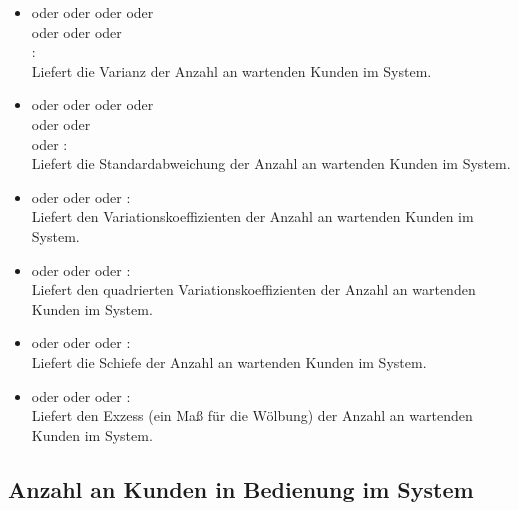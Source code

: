 \begin{itemize}
\item
{} oder  oder  oder  oder\\
 oder  oder  oder\\
:\\
Liefert die Varianz der Anzahl an wartenden Kunden im System.

\item
{} oder  oder  oder  oder\\
 oder  oder\\
 oder :\\
Liefert die Standardabweichung der Anzahl an wartenden Kunden im System.

\item
{} oder  oder  oder :\\
Liefert den Variationskoeffizienten der Anzahl an wartenden Kunden im System.

\item
{} oder  oder  oder :\\
Liefert den quadrierten Variationskoeffizienten der Anzahl an wartenden Kunden im System.

\item
{} oder  oder  oder :\\
Liefert die Schiefe der Anzahl an wartenden Kunden im System.

\item
{} oder  oder  oder :\\
Liefert den Exzess (ein Maß für die Wölbung) der Anzahl an wartenden Kunden im System.

\end{itemize}



\subsection{Anzahl an Kunden in Bedienung im System}

